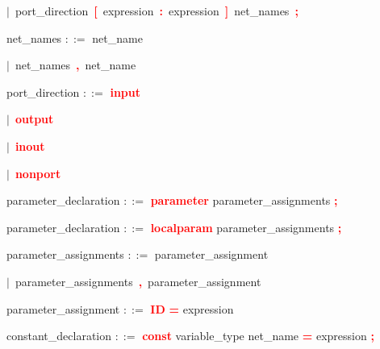 \mbox{$|$ port\_direction \textbf{\textcolor{red}{[}} expression \textbf{\textcolor{red}{:}} expression \textbf{\textcolor{red}{]}} net\_names \textbf{\textcolor{red}{;}}}

\vspace{1em}
\noindent
\settowidth{\parindent}{\hspace{4ex}}
net\_names $::=$\hspace{1ex} net\_name

\mbox{$|$ net\_names \textbf{\textcolor{red}{,}} net\_name}

\vspace{1em}
\noindent
\settowidth{\parindent}{\hspace{4ex}}
port\_direction $::=$\hspace{1ex} \textbf{\textcolor{red}{input}}

\mbox{$|$ \textbf{\textcolor{red}{output}}}

\mbox{$|$ \textbf{\textcolor{red}{inout}}}

\mbox{$|$ \textbf{\textcolor{red}{nonport}}}

\vspace{1em}
\noindent
\settowidth{\parindent}{\hspace{4ex}}
parameter\_declaration $::=$\hspace{1ex} \textbf{\textcolor{red}{parameter}} parameter\_assignments \textbf{\textcolor{red}{;}}

\vspace{1em}
\noindent
\settowidth{\parindent}{\hspace{4ex}}
parameter\_declaration $::=$\hspace{1ex} \textbf{\textcolor{red}{localparam}} parameter\_assignments \textbf{\textcolor{red}{;}}

\vspace{1em}
\noindent
\settowidth{\parindent}{\hspace{4ex}}
parameter\_assignments $::=$\hspace{1ex} parameter\_assignment

\mbox{$|$ parameter\_assignments \textbf{\textcolor{red}{,}} parameter\_assignment}

\vspace{1em}
\noindent
\settowidth{\parindent}{\hspace{4ex}}
parameter\_assignment $::=$\hspace{1ex} \textbf{\textcolor{red}{ID}} \textbf{\textcolor{red}{=}} expression

\vspace{1em}
\noindent
\settowidth{\parindent}{\hspace{4ex}}
constant\_declaration $::=$\hspace{1ex} \textbf{\textcolor{red}{const}} variable\_type net\_name \textbf{\textcolor{red}{=}} expression \textbf{\textcolor{red}{;}}

